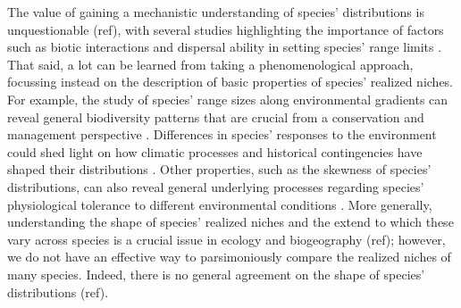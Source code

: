 \documentclass[11pt, a4paper]{article}
\begin{document}
The value of gaining a mechanistic understanding of species' distributions is unquestionable (ref), with several studies highlighting the importance of factors such as biotic interactions and dispersal ability in setting species' range limits \citep{wiszRoleBioticInteractions2013, pollockUnderstandingCooccurrenceModelling2014, neuschulzBioticInteractionsSeed2018}. That said, a lot can be learned from taking a phenomenological approach, focussing instead on the description of basic properties of species' realized niches. For example, the study of species' range sizes along environmental gradients can reveal general biodiversity patterns that are crucial from a conservation and management perspective \citep{stevensElevationalGradientAltitudinal1992}. Differences in species' responses to the environment could shed light on how climatic processes and historical contingencies have shaped their distributions \citep{rohdeLatitudinalGradientsSpecies1992, more in Rapoport}. Other properties, such as the skewness of species' distributions, can also reveal general underlying processes regarding species' physiological tolerance to different environmental conditions \citep{kaufmanDiversityNewWorld1995}. More generally, understanding the shape of species' realized niches and the extend to which these vary across species is a crucial issue in ecology and biogeography (ref); however, we do not have an effective way to parsimoniously compare the realized niches of many species. Indeed, there is no general agreement on the shape of species' distributions (ref).
\end{document}
